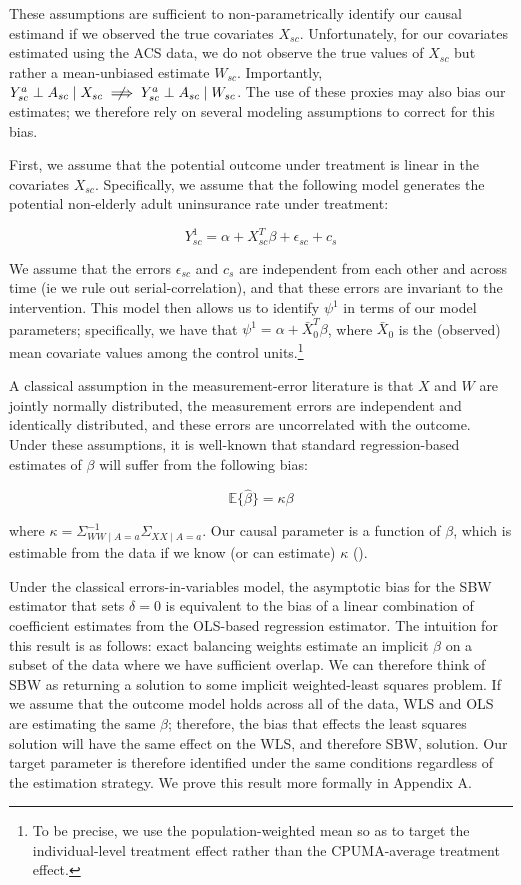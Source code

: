 \documentclass[12pt]{article}
\begin{document}
These assumptions are sufficient to non-parametrically identify our causal estimand if we observed the true covariates $X_{sc}$. Unfortunately, for our covariates estimated using the ACS data, we do not observe the true values of $X_{sc}$ but rather a mean-unbiased estimate $W_{sc}$. Importantly, $Y_{sc}^a \perp A_{sc} \mid X_{sc} \centernot\implies Y_{sc}^a \perp A_{sc} \mid W_{sc}$. The use of these proxies may also bias our estimates; we therefore rely on several modeling assumptions to correct for this bias.

First, we assume that the potential outcome under treatment is linear in the covariates $X_{sc}$. Specifically, we assume that the following model generates the potential non-elderly adult uninsurance rate under treatment:

$$
Y_{sc}^1 = \alpha + X_{sc}^T\beta + \epsilon_{sc} + c_s
$$

We assume that the errors $\epsilon_{sc}$ and $c_s$ are independent from each other and across time (ie we rule out serial-correlation), and that these errors are invariant to the intervention. This model then allows us to identify $\psi^1$ in terms of our model parameters; specifically, we have that $\psi^1 = \alpha + \bar{X}_0^T\beta$, where $\bar{X}_0$ is the (observed) mean covariate values among the control units.\footnote{To be precise, we use the population-weighted mean so as to target the individual-level treatment effect rather than the CPUMA-average treatment effect.} 

A classical assumption in the measurement-error literature is that $X$ and $W$ are jointly normally distributed, the measurement errors are independent and identically distributed, and these errors are uncorrelated with the outcome. Under these assumptions, it is well-known that standard regression-based estimates of $\beta$ will suffer from the following bias:

$$
\mathbb{E}\{\hat{\beta}\} = \kappa \beta
$$

where $\kappa = \Sigma_{WW \mid A = a}^{-1}\Sigma_{XX \mid A = a}$. Our causal parameter is a function of $\beta$, which is estimable from the data if we know (or can estimate) $\kappa$ (\cite{gleser1992importance}). 

Under the classical errors-in-variables model, the asymptotic bias for the SBW estimator that sets $\delta = 0$ is equivalent to the bias of a linear combination of coefficient estimates from the OLS-based regression estimator. The intuition for this result is as follows: exact balancing weights estimate an implicit $\beta$ on a subset of the data where we have sufficient overlap. We can therefore think of SBW as returning a solution to some implicit weighted-least squares problem. If we assume that the outcome model holds across all of the data, WLS and OLS are estimating the same $\beta$; therefore, the bias that effects the least squares solution will have the same effect on the WLS, and therefore SBW, solution. Our target parameter is therefore identified under the same conditions regardless of the estimation strategy. We prove this result more formally in Appendix A.
\end{document}
